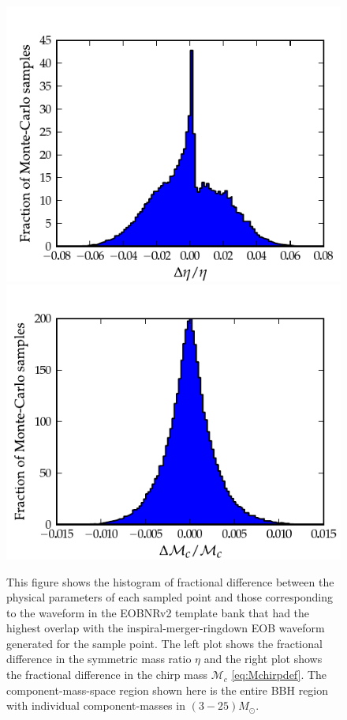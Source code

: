 \documentclass[aps,
prd,
amsmath,
amssymb,
twocolumn,
floatfix,
groupedaddress]{revtex4-1}
\begin{document}
\begin{figure}[]
\centerline{
\includegraphics[scale=0.04, clip=false,keepaspectratio=true, width=\columnwidth]{hist_eta_errparamEOBHMEOB22.pdf}\label{fig:errparams_eob22eobhm_eta}              
\includegraphics[scale=0.04, clip=false, keepaspectratio=true, width=\columnwidth]{hist_mchirp_errparamEOBHMEOB22.pdf}\label{fig:errparams_eob22eobhm_mchirp}
}
\caption{This figure shows the histogram of fractional difference between the physical parameters of each sampled point and those corresponding to the waveform in the EOBNRv2 template bank that had the highest overlap with the inspiral-merger-ringdown EOB waveform generated for the sample point. The left plot shows the fractional difference in the symmetric mass ratio $\eta$ and the right plot shows the fractional difference in the chirp mass $\mathcal{M}_c$ \eqref{eq:Mchirpdef}. The component-mass-space region shown here is the entire BBH region with individual component-masses in $(3-25)M_{\odot}$.}
\label{fig:errparams_eob22eobhm}
\end{figure}
\end{document}

